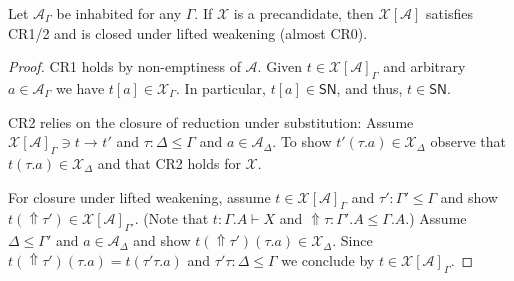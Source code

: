\documentclass[a4paper,USenglish,cleveref, autoref, thm-restate]{lipics-v2019}
\newcommand{\red}[1][]{\longrightarrow_{#1}}
\newcommand{\A}{\mathcal{A}}
\newcommand{\X}{\mathcal{X}}
\newcommand{\SN}{\mathsf{SN}}
\newcommand{\Intro}{\mathsf{Intro}}
\newcommand{\Up}{\mathop{\Uparrow}}
\begin{document}
\begin{lemma}[Abstraction]
\label{lem:abs}
  Let $\A_\Gamma$ be inhabited for any $\Gamma$.
  If $\X$ is a precandidate, then $\X[\A]$ satisfies CR1/2 and is
  closed under lifted weakening (almost CR0).
\end{lemma}
\begin{proof}
  CR1 holds by non-emptiness of $\A$.  Given $t \in \X[\A]_\Gamma$ and
  arbitrary $a \in \A_\Gamma$ we have $t[a] \in \X_\Gamma$.  In
  particular, $t[a] \in \SN$, and thus, $t \in \SN$.

  CR2 relies on the closure of reduction
  under substitution:  Assume $\X[\A]_\Gamma \ni t \red t'$ and $\tau
  : \Delta \leq \Gamma$ and $a \in \A_\Delta$.  To show $t'(\tau.a)
  \in \X_\Delta$ observe that $t(\tau.a) \in \X_\Delta$ and that CR2
  holds for $\X$.

  For closure under lifted weakening, assume $t \in \X[\A]_\Gamma$ and
  $\tau' : \Gamma' \leq \Gamma$ and show $t(\Up\tau') \in \X[\A]_{\Gamma'}$.
  (Note that $t : \Gamma.A \vdash X$ and $\Up\tau : \Gamma'.A \leq
  \Gamma.A$.)
  Assume $\Delta \leq \Gamma'$ and $a \in \A_\Delta$ and show
  $t(\Up\tau')(\tau.a) \in \X_\Delta$.  Since $t(\Up\tau')(\tau.a) =
  t(\tau'\tau.a)$ and $\tau'\tau : \Delta \leq \Gamma$ we conclude by
  $t \in \X[\A]_\Gamma$.

\end{proof}
\end{document}
